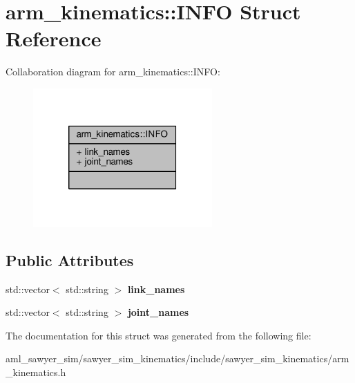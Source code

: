\hypertarget{structarm__kinematics_1_1_i_n_f_o}{\section{arm\-\_\-kinematics\-:\-:I\-N\-F\-O Struct Reference}
\label{structarm__kinematics_1_1_i_n_f_o}
}


Collaboration diagram for arm\-\_\-kinematics\-:\-:I\-N\-F\-O\-:
\nopagebreak
\begin{figure}[H]
\begin{center}
\leavevmode
\includegraphics[width=194pt]{structarm__kinematics_1_1_i_n_f_o__coll__graph}
\end{center}
\end{figure}
\subsection*{Public Attributes}
\begin{DoxyCompactItemize}
\item 
\hypertarget{structarm__kinematics_1_1_i_n_f_o_a42c69394d20c2c7205e811870a625fb8}{std\-::vector$<$ std\-::string $>$ {\bfseries link\-\_\-names}}\label{structarm__kinematics_1_1_i_n_f_o_a42c69394d20c2c7205e811870a625fb8}

\item 
\hypertarget{structarm__kinematics_1_1_i_n_f_o_a157c678ee40e35769f01b40395e5b29b}{std\-::vector$<$ std\-::string $>$ {\bfseries joint\-\_\-names}}\label{structarm__kinematics_1_1_i_n_f_o_a157c678ee40e35769f01b40395e5b29b}

\end{DoxyCompactItemize}


The documentation for this struct was generated from the following file\-:\begin{DoxyCompactItemize}
\item 
aml\-\_\-sawyer\-\_\-sim/sawyer\-\_\-sim\-\_\-kinematics/include/sawyer\-\_\-sim\-\_\-kinematics/arm\-\_\-kinematics.\-h\end{DoxyCompactItemize}
